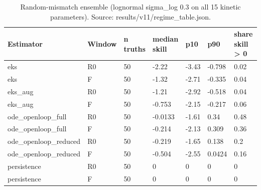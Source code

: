 \begin{table}[t]
\centering
\caption{Random-mismatch ensemble (lognormal sigma\_log 0.3 on all 15 kinetic parameters). Source: results/v11/regime\_table.json.}
\label{tab:si-random}
\footnotesize
\begin{tabular}{lllllll}
\toprule
Estimator & Window & n truths & median skill & p10 & p90 & share skill > 0 \\
\midrule
eks & R0 & 50 & -2.22 & -3.43 & -0.798 & 0.02 \\
eks & F & 50 & -1.32 & -2.71 & -0.335 & 0.04 \\
eks\_aug & R0 & 50 & -1.21 & -2.92 & -0.518 & 0.04 \\
eks\_aug & F & 50 & -0.753 & -2.15 & -0.217 & 0.06 \\
ode\_openloop\_full & R0 & 50 & -0.0133 & -1.61 & 0.34 & 0.48 \\
ode\_openloop\_full & F & 50 & -0.214 & -2.13 & 0.309 & 0.36 \\
ode\_openloop\_reduced & R0 & 50 & -0.219 & -1.65 & 0.138 & 0.2 \\
ode\_openloop\_reduced & F & 50 & -0.504 & -2.55 & 0.0424 & 0.16 \\
persistence & R0 & 50 & 0 & 0 & 0 & 0 \\
persistence & F & 50 & 0 & 0 & 0 & 0 \\
\bottomrule
\end{tabular}
\end{table}
